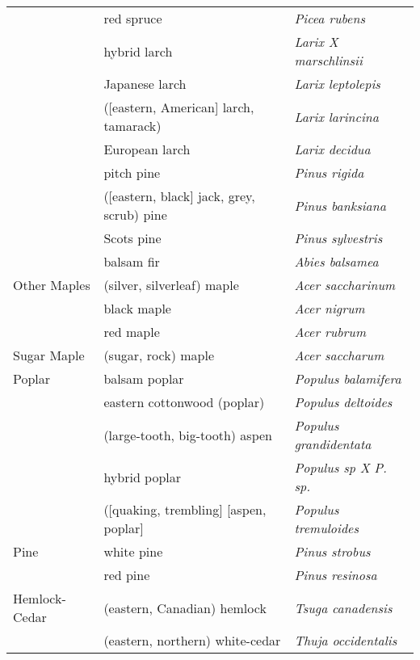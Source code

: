 \documentclass{article}
\begin{document}
\begin{table}
{\begin{tabular}{lll}
      &    red spruce &   \emph{Picea rubens} \\
      &    hybrid larch &   \emph{Larix X marschlinsii} \\
      &    Japanese larch &   \emph{Larix leptolepis} \\
      &    ([eastern, American] larch, tamarack) &   \emph{Larix larincina} \\
      &    European larch &   \emph{Larix decidua} \\
      &    pitch pine &   \emph{Pinus rigida} \\
      &    ([eastern, black] jack, grey, scrub) pine &   \emph{Pinus banksiana} \\
      &    Scots pine &   \emph{Pinus sylvestris} \\
      &    balsam fir &   \emph{Abies balsamea} \\
Other Maples        &     (silver, silverleaf) maple &   \emph{Acer saccharinum} \\
        &     black maple &   \emph{Acer nigrum} \\
        &     red maple &   \emph{Acer rubrum} \\
Sugar Maple        &     (sugar, rock) maple &   \emph{Acer saccharum} \\
Poplar        &     balsam poplar &   \emph{Populus balamifera} \\
       &     eastern cottonwood (poplar) &   \emph{Populus deltoides} \\
       &     (large-tooth, big-tooth) aspen &   \emph{Populus grandidentata} \\
       &     hybrid poplar &   \emph{Populus sp X P. sp.} \\
       &     ([quaking, trembling] [aspen, poplar] &   \emph{Populus tremuloides} \\
Pine        &     white pine &   \emph{Pinus strobus} \\
       &     red pine &   \emph{Pinus resinosa} \\
Hemlock-Cedar    &    (eastern, Canadian) hemlock &   \emph{Tsuga canadensis} \\
    &    (eastern, northern) white-cedar &   \emph{Thuja occidentalis} \\
\bottomrule
\end{tabular}
}%
\end{table}
\end{document}

